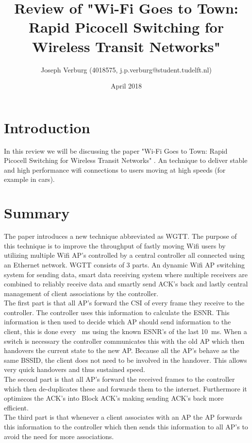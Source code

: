 \documentclass[a4paper]{article}
\title{Review of "Wi-Fi Goes to Town: Rapid Picocell Switching for Wireless Transit Networks"}
\author{
Joseph Verburg (4018575, j.p.verburg@student.tudelft.nl)
}
\date{April 2018}
\begin{document}
\maketitle

\section{Introduction}
In this review we will be discussing the paper "Wi-Fi Goes to Town: Rapid Picocell Switching for Wireless Transit Networks" \cite{Song:2017:WGT:3098822.3098846}. An technique to deliver stable and high performance wifi connections to users moving at high speeds (for example in cars).

\section{Summary}
The paper introduces a new technique abbreviated as WGTT.
The purpose of this technique is to improve the throughput of fastly moving Wifi users by utilizing multiple Wifi AP's controlled by a central controller all connected using an Ethernet network.
WGTT consists of 3 parts. An dynamic Wifi AP switching system for sending data, smart data receiving system where multiple receivers are combined to reliably receive data and smartly send ACK's back and lastly central management of client associations by the controller.\\

The first part is that all AP's forward the CSI of every frame they receive to the controller. The controller uses this information to calculate the ESNR. This information is then used to decide which AP should send information to the client, this is done every \SI{}{\milli\second} using the known ESNR's of the last \SI{10}{\milli\second}. When a switch is necessary the controller communicates this with the old AP which then handovers the current state to the new AP. Because all the AP's behave as the same BSSID, the client does not need to be involved in the handover. This allows very quick handovers and thus sustained speed. \\

The second part is that all AP's forward the received frames to the controller which then de-duplicates these and forwards them to the internet. Furthermore it optimizes the ACK's into Block ACK's making sending ACK's back more efficient.\\

The third part is that whenever a client associates with an AP the AP forwards this information to the controller which then sends this information to all AP's to avoid the need for more associations.\\
\end{document}
